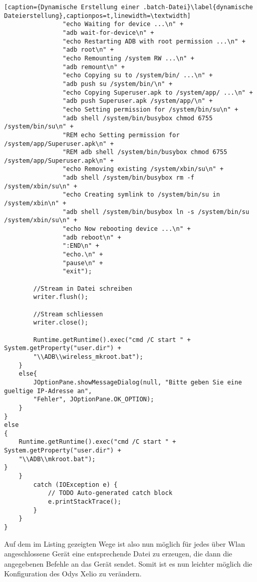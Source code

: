 \begin{flushleft}
\begin{lstlisting}[caption={Dynamische Erstellung einer .batch-Datei}\label{dynamische Dateierstellung},captionpos=t,linewidth=\textwidth]
				"echo Waiting for device ...\n" +
				"adb wait-for-device\n" +
				"echo Restarting ADB with root permission ...\n" +
				"adb root\n" +
				"echo Remounting /system RW ...\n" +
				"adb remount\n" +
				"echo Copying su to /system/bin/ ...\n" +
				"adb push su /system/bin/\n" +
				"echo Copying Superuser.apk to /system/app/ ...\n" +
				"adb push Superuser.apk /system/app/\n" +
				"echo Setting permission for /system/bin/su\n" +
				"adb shell /system/bin/busybox chmod 6755 /system/bin/su\n" +
				"REM echo Setting permission for /system/app/Superuser.apk\n" +
				"REM adb shell /system/bin/busybox chmod 6755 /system/app/Superuser.apk\n" +
				"echo Removing existing /system/xbin/su\n" +
				"adb shell /system/bin/busybox rm -f /system/xbin/su\n" +
				"echo Creating symlink to /system/bin/su in /system/xbin\n" +
				"adb shell /system/bin/busybox ln -s /system/bin/su /system/xbin/su\n" +
				"echo Now rebooting device ...\n" +
				"adb reboot\n" +
				":END\n" +
				"echo.\n" +
				"pause\n" +
				"exit");
				
		//Stream in Datei schreiben
		writer.flush();
								
		//Stream schliessen
		writer.close();
								
		Runtime.getRuntime().exec("cmd /C start " + System.getProperty("user.dir") + 
		"\\ADB\\wireless_mkroot.bat");
	}
	else{
		JOptionPane.showMessageDialog(null, "Bitte geben Sie eine gueltige IP-Adresse an", 
		"Fehler", JOptionPane.OK_OPTION);
	}
}
else
{
	Runtime.getRuntime().exec("cmd /C start " + System.getProperty("user.dir") + 
	"\\ADB\\mkroot.bat");
}	
	}
		catch (IOException e) {
			// TODO Auto-generated catch block
			e.printStackTrace();
		}
	}
}
\end{lstlisting}

Auf dem im Listing gezeigten Wege ist also nun möglich für jedes über Wlan angeschlossene Gerät eine entsprechende Datei zu erzeugen, die dann die angegebenen Befehle an das Gerät sendet. Somit ist es nun leichter möglich die Konfiguration des Odys Xelio zu verändern. 


\end{flushleft}
